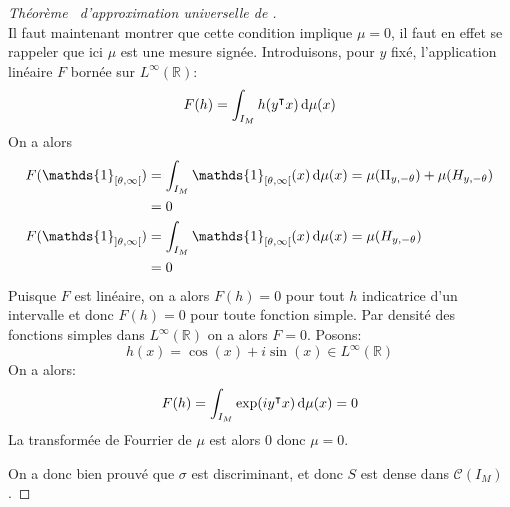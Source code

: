 \begin{proof}[Théorème~\label{cybenko} d'approximation universelle de \citet{Cybenko}]
\begin{equation*}
    \end{equation*}
    Il faut maintenant montrer que cette condition implique $\mu = 0$, il faut en effet se rappeler que ici $\mu$ est une mesure signée. Introduisons, pour $y$ fixé, l'application linéaire $F$ bornée sur $L^\infty (\mathbb{R})$:
    \begin{equation*}
        F(h) = \int_{I_M} h(y^\intercal x) \mathop{}\!\mathrm{d} \mu (x)
    \end{equation*}
    On a alors
    \begin{align*}
        F(\mathds{1}_{[\theta,\infty[}) &= \int_{I_M} \mathds{1}_{[\theta,\infty[} (x) \diff \mu (x) = \mu(\Pi_{y,-\theta}) + \mu (H_{y,-\theta}) \\
        &= 0 \\
        F(\mathds{1}_{]\theta,\infty[}) &= \int_{I_M} \mathds{1}_{[\theta,\infty[} (x) \diff \mu (x) = \mu (H_{y,-\theta}) \\
        &= 0
    \end{align*}
    Puisque $F$ est linéaire, on a alors $F(h) = 0$ pour tout $h$ indicatrice d'un intervalle et donc $F(h) = 0$ pour toute fonction simple. Par densité des fonctions simples dans $L^\infty (\mathbb{R})$ on a alors $F = 0$.
    Posons:
    \begin{equation*}
        h(x) = \cos (x) + i \sin (x) \in L^\infty (\mathbb{R})
    \end{equation*}
    On a alors:
    \begin{equation*}
        F(h) = \int_{I_M} \exp( i y^\intercal x ) \mathop{}\!\mathrm{d} \mu (x) = 0
    \end{equation*}
    La transformée de Fourrier de $\mu$ est alors $0$ donc $\mu = 0$.
    
    On a donc bien prouvé que $\sigma$ est discriminant, et donc $S$ est dense dans $\mathcal{C} (I_M)$.
\end{proof}